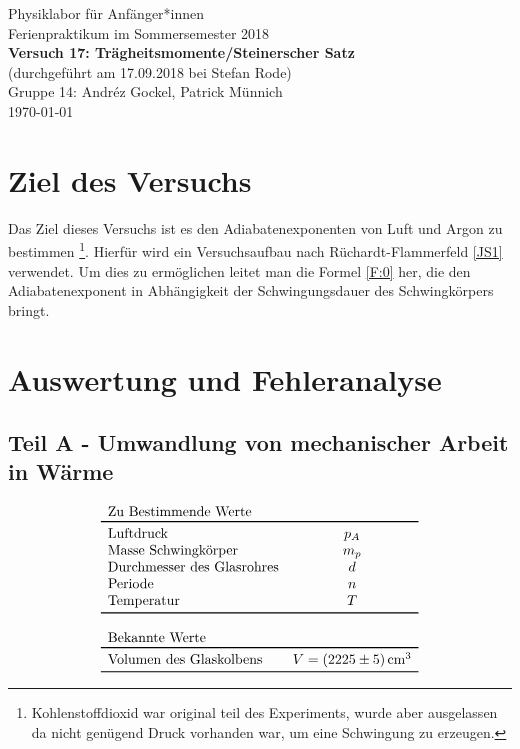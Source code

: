 \documentclass[11pt,a4paper]{article}
\begin{document}
{
\centering 
\large 
Physiklabor für Anf\"anger*innen \\
Ferienpraktikum im Sommersemester 2018 \\[4mm]
\textbf{\LARGE 
Versuch 17: Trägheitsmomente/Steinerscher Satz
} \\[3mm]
(durchgef\"uhrt am 17.09.2018 bei Stefan Rode)\\
Gruppe 14: Andréz Gockel, Patrick M\"unnich\\ 
\today \\[10mm]
}

\section{Ziel des Versuchs}

Das Ziel dieses Versuchs ist es den Adiabatenexponenten von Luft und Argon zu bestimmen \footnote{Kohlenstoffdioxid war original teil des Experiments, wurde aber ausgelassen da nicht genügend Druck vorhanden war, um eine Schwingung zu erzeugen.}. Hierfür wird ein Versuchsaufbau nach Rüchardt-Flammerfeld \ref{JS1} verwendet. Um dies zu ermöglichen leitet man die Formel \ref{F:0} her, die den Adiabatenexponent in Abhängigkeit der Schwingungsdauer des Schwingkörpers bringt.


\section{Auswertung und Fehleranalyse}

\subsection{Teil A - Umwandlung von mechanischer Arbeit in Wärme }
$$
\begin{array}{lc}
	\multicolumn{1}{l}{\textrm{Zu Bestimmende Werte}} \\
	\toprule 
	\textrm{Luftdruck} & p_A \\
	\textrm{Masse Schwingkörper} & m_{p} \\
	\textrm{Durchmesser des Glasrohres} & d\\
	\textrm{Periode} & n \\
	\textrm{Temperatur} & T\\
	\bottomrule \\
	\multicolumn{2}{l}{\textrm{Bekannte Werte}} \\
	\toprule
	\textrm{Volumen des Glaskolbens} & V = (2225 \pm 5)\,\textrm{cm}^3\\
	\bottomrule 
\end{array}
$$
\end{document}
